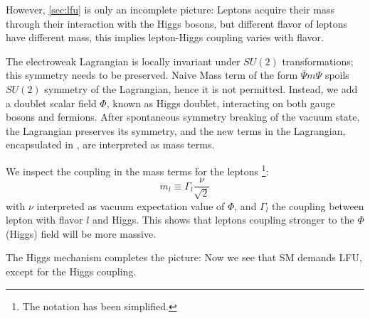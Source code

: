 However, \autoref{sec:lfu} is only an incomplete picture:
Leptons acquire their mass through their interaction with the Higgs bosons,
but different flavor of leptons have different mass, this implies lepton-Higgs coupling varies with flavor.

The electroweak Lagrangian is locally invariant under $SU(2)$ transformations;
this symmetry needs to be preserved.
Naive Mass term of the form $\overline{\Psi} m \Psi$
spoils $SU(2)$ symmetry of the Lagrangian, hence it is not permitted.
Instead, we add a doublet scalar field $\Phi$, known as Higgs doublet, interacting on both gauge bosons
and fermions.
After spontaneous symmetry breaking of the vacuum state, the Lagrangian preserves its
symmetry, and the new terms in the Lagrangian, encapsulated in , are interpreted as mass terms.

We inspect the coupling in the mass terms for the leptons \cite{Langacker:2010zza}\footnote{
    The notation has been simplified.
}:
\begin{equation}
    m_l \equiv \Gamma_l \frac{\nu}{\sqrt{2}}
\end{equation}
with $\nu$ interpreted as vacuum expectation value of $\Phi$, and $\Gamma_l$ the coupling between lepton with flavor $l$ and Higgs.
This shows that leptons coupling stronger to the $\Phi$ (Higgs) field will be
more massive.

The Higgs mechanism completes the picture:
Now we see that SM demands LFU, except for the Higgs coupling.
